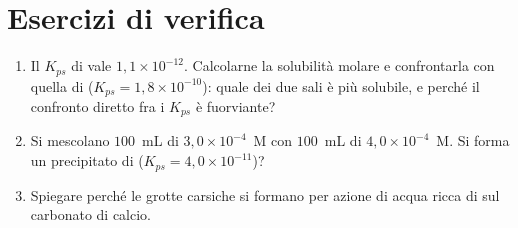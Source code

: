 \documentclass[11pt, a4paper, openright]{book}
\begin{document}
\section{Esercizi di verifica}

\begin{enumerate}
  \item Il $K_{ps}$ di  vale $1{,}1 \times 10^{-12}$. Calcolarne la solubilità
        molare e confrontarla con quella di 
        ($K_{ps} = 1{,}8 \times 10^{-10}$): quale dei due sali è più solubile, e perché il
        confronto diretto fra i $K_{ps}$ è fuorviante?
  \item Si mescolano $100$~mL di  $3{,}0 \times 10^{-4}$~M con $100$~mL di
         $4{,}0 \times 10^{-4}$~M. Si forma un precipitato di 
        ($K_{ps} = 4{,}0 \times 10^{-11}$)?
  \item Spiegare perché le grotte carsiche si formano per azione di acqua ricca di
         sul carbonato di calcio.
\end{enumerate}
\end{document}
